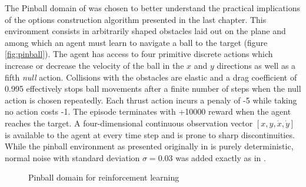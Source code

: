 The Pinball domain of \cite{Konidaris2009} was chosen to better understand the practical implications of the options construction algorithm presented in the last chapter. This environment consists in arbitrarily shaped obstacles laid out on the plane and among which an agent must learn to navigate a ball to the target (figure \ref{fig:pinball}). The agent has access to four primitive discrete actions which increase or decrease the velocity of the ball in the $x$ and $y$ directions as well as a fifth \textit{null} action. Collisions with the obstacles are elastic and a drag coefficient of 0.995 effectively stops ball movements after a finite number of steps when the null action is chosen repeatedly. Each thrust action incurs a penaly of -5 while taking no action costs -1. The episode terminates with +10000 reward when the agent reaches  the target. A four-dimensional continuous observation vector $[ x, y, \dot{x}, \dot{y}]$ is available to the agent at every time step and is prone to sharp discontinuities. While the pinball environment as presented originally in \cite{Konidaris2009} is purely deterministic, normal noise with standard deviation $\sigma = 0.03$ was added exactly as in \cite{Tamar2013}. 

\begin{figure}
\centering
{}%
%
\caption{Pinball domain for reinforcement learning}
\end{figure}

